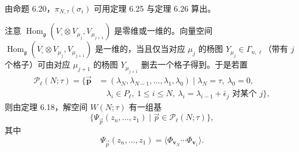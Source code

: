 由命题 6.20，$\pi_{N,\tau}(\sigma_i)$ 可用定理 6.25 与定理 6.26 算出。

注意 $\operatorname{Hom}_{\mathfrak{g}}(V_{\square}\otimes V_{\mu_j},
V_{\mu_{j+1}})$ 是零维或一维的。向量空间
$\operatorname{Hom}_{\mathfrak{g}}(V_{\square}\otimes V_{\mu_j},
V_{\mu_{j+1}})$ 是一维的，当且仅当对应 $\mu_j$ 的杨图
$Y_{\mu_j}\in\Gamma_{n,\ell}$（带有 $j$ 个格子）可由对应 $\mu_{j+1}$ 的杨图
$Y_{\mu_{j+1}}$ 删去一个格子得到。于是若置
\[
\begin{aligned}
\mathcal P_\ell(N;\tau)=\{\vec{\mathbf p}
&=(\lambda_N,\lambda_{N-1},\dots,\lambda_1,\lambda_0)\mid
\lambda_N=\tau,\ \lambda_0=0,\\
&\quad\lambda_i\in P_\ell,\ 1\le i\le N,\
\lambda_i=\lambda_{i-1}+\bar\epsilon_j\text{ 对某个 }j\},
\end{aligned}
\]
则由定理 6.18，解空间 $W(N;\tau)$ 有一组基
\[
\{\Psi_{\vec p}(z_n,\dots,z_1)\mid\vec p\in\mathcal P_\ell(N;\tau)\},
\]
其中
\[
\Psi_{\vec p}(z_n,\dots,z_1)=\langle\Phi_{\mathbf{v}_N}\cdots\Phi_{\mathbf{v}_1}\rangle.
\]


